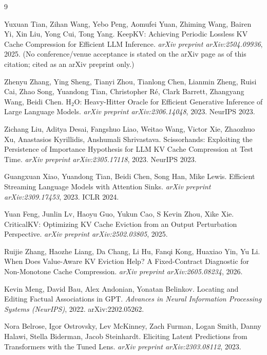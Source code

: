\documentclass[11pt]{article}
\begin{document}
\begin{thebibliography}{9}

Yuxuan Tian, Zihan Wang, Yebo Peng, Aomufei Yuan, Zhiming Wang, Bairen Yi,
Xin Liu, Yong Cui, Tong Yang.
\newblock KeepKV: Achieving Periodic Lossless KV Cache Compression for
Efficient LLM Inference.
\newblock \emph{arXiv preprint arXiv:2504.09936}, 2025.
\newblock (No conference/venue acceptance is stated on the arXiv page as of
this citation; cited as an arXiv preprint only.)

Zhenyu Zhang, Ying Sheng, Tianyi Zhou, Tianlong Chen, Lianmin Zheng, Ruisi
Cai, Zhao Song, Yuandong Tian, Christopher R\'e, Clark Barrett, Zhangyang
Wang, Beidi Chen.
\newblock H$_2$O: Heavy-Hitter Oracle for Efficient Generative Inference of
Large Language Models.
\newblock \emph{arXiv preprint arXiv:2306.14048}, 2023. NeurIPS 2023.

Zichang Liu, Aditya Desai, Fangshuo Liao, Weitao Wang, Victor Xie, Zhaozhuo
Xu, Anastasios Kyrillidis, Anshumali Shrivastava.
\newblock Scissorhands: Exploiting the Persistence of Importance Hypothesis
for LLM KV Cache Compression at Test Time.
\newblock \emph{arXiv preprint arXiv:2305.17118}, 2023. NeurIPS 2023.

Guangxuan Xiao, Yuandong Tian, Beidi Chen, Song Han, Mike Lewis.
\newblock Efficient Streaming Language Models with Attention Sinks.
\newblock \emph{arXiv preprint arXiv:2309.17453}, 2023. ICLR 2024.

Yuan Feng, Junlin Lv, Haoyu Guo, Yukun Cao, S Kevin Zhou, Xike Xie.
\newblock CriticalKV: Optimizing KV Cache Eviction from an Output
Perturbation Perspective.
\newblock \emph{arXiv preprint arXiv:2502.03805}, 2025.

Ruijie Zhang, Haozhe Liang, Da Chang, Li Hu, Fanqi Kong, Huaxiao Yin, Yu Li.
\newblock When Does Value-Aware KV Eviction Help? A Fixed-Contract
Diagnostic for Non-Monotone Cache Compression.
\newblock \emph{arXiv preprint arXiv:2605.08234}, 2026.

Kevin Meng, David Bau, Alex Andonian, Yonatan Belinkov.
\newblock Locating and Editing Factual Associations in GPT.
\newblock \emph{Advances in Neural Information Processing Systems (NeurIPS)},
2022. arXiv:2202.05262.

Nora Belrose, Igor Ostrovsky, Lev McKinney, Zach Furman, Logan Smith, Danny
Halawi, Stella Biderman, Jacob Steinhardt.
\newblock Eliciting Latent Predictions from Transformers with the Tuned
Lens.
\newblock \emph{arXiv preprint arXiv:2303.08112}, 2023.

\end{thebibliography}
\end{document}
